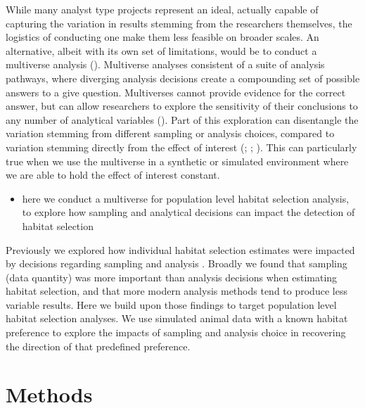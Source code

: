\documentclass[10pt,a4paper]{article}
\providecommand{\tightlist}{%
  \setlength{\itemsep}{0pt}\setlength{\parskip}{0pt}}
\begin{document}
While many analyst type projects represent an ideal, actually capable of capturing the variation in results stemming from the researchers themselves, the logistics of conducting one make them less feasible on broader scales.
An alternative, albeit with its own set of limitations, would be to conduct a multiverse analysis ().
Multiverse analyses consistent of a suite of analysis pathways, where diverging analysis decisions create a compounding set of possible answers to a give question.
Multiverses cannot provide evidence for the correct answer, but can allow researchers to explore the sensitivity of their conclusions to any number of analytical variables ().
Part of this exploration can disentangle the variation stemming from different sampling or analysis choices, compared to variation stemming directly from the effect of interest (; ; ).
This can particularly true when we use the multiverse in a synthetic or simulated environment where we are able to hold the effect of interest constant.

\begin{itemize}
\tightlist
\item
  here we conduct a multiverse for population level habitat selection analysis, to explore how sampling and analytical decisions can impact the detection of habitat selection
\end{itemize}

Previously we explored how individual habitat selection estimates were impacted by decisions regarding sampling and analysis .
Broadly we found that sampling (data quantity) was more important than analysis decisions when estimating habitat selection, and that more modern analysis methods tend to produce less variable results.
Here we build upon those findings to target population level habitat selection analyses. We use simulated animal data with a known habitat preference to explore the impacts of sampling and analysis choice in recovering the direction of that predefined preference.

\section{Methods}\label{methods}
\end{document}
